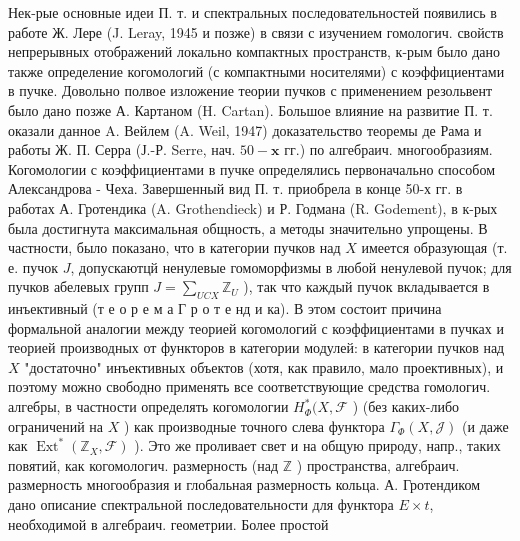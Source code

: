 \documentclass[10pt]{article}
\begin{document}
Нек-рые основные идеи П. т. и спектральных последовательностей появились в работе Ж. Лере (J. Leray, 1945 и позже) в связи с изучением гомологич. свойств непрерывных отображений локально компактных пространств, к-рым было дано также определение когомологий (с компактными носителями) с коэффициентами в пучке. Довольно полвое изложение теории пучков с применением резольвент было дано позже А. Картаном (H. Cartan). Большое влияние на развитие П. т. оказали данное A. Вейлем (A. Weil, 1947) доказательство теоремы де Рама и работы Ж. П. Серра (Ј.-Р. Serre, нач. $50-\mathbf{x}$ гг.) по алгебраич. многообразиям. Когомологии с коэффициентами в пучке определялись первоначально способом Александрова - Чеха. Завершенный вид П. т. приобрела в конце 50-х гг. в работах А. Гротендика (A. Grothendieck) и Р. Годмана (R. Godement), в к-рых была достигнута максимальная общность, а методы значительно упрощены. В частности, было показано, что в категории пучков над $X$ имеется образующая (т. е. пучок $J$, допускаютцй ненулевые гомоморфизмы в любой ненулевой пучок; для пучков абелевых групп $J=\sum_{U C X} \mathbb{Z}_{U}$ ), так что каждый пучок вкладывается в инъективный (т е о р е м а Г р о т е нд и ка). В этом состоит причина формальной аналогии между теорией когомологий с коэффициентами в пучках и теорией производных от функторов в категории модулей: в категории пучков над $X$ "достаточно" инъективных объектов (хотя, как правило, мало проективных), и поэтому можно свободно применять все соответствующие средства гомологич. алгебры, в частности определять когомологии $H_{\Phi}^{*}(X, \mathscr{F}$ ) (без каких-либо ограничений на $X$ ) как производные точного слева функтора $\Gamma_{\Phi}(X, \mathscr{J})$ (и даже как $\operatorname{Ext}^{*}\left(\mathbb{Z}_{X}, \mathscr{F}\right)$ ). Это же проливает свет и на общую природу, напр., таких повятий, как когомологич. размерность (над $\mathbb{Z}$ ) пространства, алгебраич. размерность многообразия и глобальная размерность кольца. А. Гротендиком дано описание спектральной последовательности для функтора $E \times t$, необходимой в алгебраич. геометрии. Более простой
\end{document}
